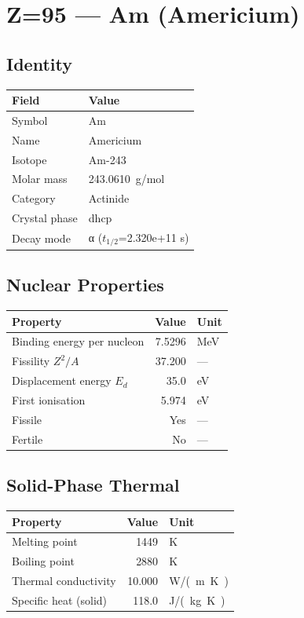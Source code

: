\documentclass[11pt,a4paper]{article}
\begin{document}
\newpage

\section{Z=95 --- Am (Americium)}
\label{sec:Z95}

\subsection{Identity}
\begin{tabular}{ll}
  \toprule
  Field & Value \\
  \midrule
  Symbol & Am \\
  Name & Americium \\
  Isotope & Am-243 \\
  Molar mass & \SI{243.0610}{g/mol} \\
  Category & Actinide \\
  Crystal phase & dhcp \\
  Decay mode & α ($t_{1/2}$=2.320e+11 s) \\
  \bottomrule
\end{tabular}

\subsection{Nuclear Properties}
\begin{tabular}{lrl}
  \toprule
  Property & Value & Unit \\
  \midrule
  Binding energy per nucleon & 7.5296 & \si{MeV} \\
  Fissility $Z^2/A$ & 37.200 & --- \\
  Displacement energy $E_d$ & 35.0 & \si{eV} \\
  First ionisation & 5.974 & \si{eV} \\
  Fissile & Yes & --- \\
  Fertile & No & --- \\
  \bottomrule
\end{tabular}

\subsection{Solid-Phase Thermal}
\begin{tabular}{lrl}
  \toprule
  Property & Value & Unit \\
  \midrule
  Melting point & 1449 & \si{K} \\
  Boiling point & 2880 & \si{K} \\
  Thermal conductivity & 10.000 & \si{W/(m.K)} \\
  Specific heat (solid) & 118.0 & \si{J/(kg.K)} \\
  \bottomrule
\end{tabular}
\end{document}
